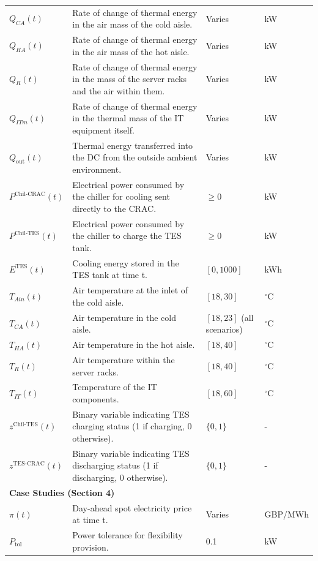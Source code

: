 \documentclass[lettersize,journal]{IEEEtran}
\begin{document}
{{\begin{longtable}{p{} p{} p{} p{}}
$Q_{CA}(t)$ & Rate of change of thermal energy in the air mass of the cold aisle. & Varies &kW \\
$Q_{HA}(t)$ & Rate of change of thermal energy in the air mass of the hot aisle. & Varies &kW \\
$Q_{R}(t)$ & Rate of change of thermal energy in the mass of the server racks and the air within them. & Varies &kW \\
$Q_{ITm}(t)$ & Rate of change of thermal energy in the thermal mass of the IT equipment itself. & Varies &kW \\
$Q_{\mathrm{out}}(t)$ & Thermal energy transferred into the DC from the outside ambient environment. & Varies &kW \\
$P^{\mathrm{Chil}\text{-}\mathrm{CRAC}}(t)$ & Electrical power consumed by the chiller for cooling sent directly to the CRAC. & $\geq 0$ &kW \\
$P^{\mathrm{Chil}\text{-}\mathrm{TES}}(t)$ & Electrical power consumed by the chiller to charge the TES tank. & $\geq 0$ &kW \\
$E^{\mathrm{TES}}(t)$ & Cooling energy stored in the TES tank at time t. & $[0, 1000]$ &kWh \\
$T_{Ain}(t)$ & Air temperature at the inlet of the cold aisle. & $[18, 30]$ & $^{\circ}$C \\
$T_{CA}(t)$ & Air temperature in the cold aisle. & $[18, 23]$ (all scenarios) & $^{\circ}$C \\
$T_{HA}(t)$ & Air temperature in the hot aisle. & $[18, 40]$ & $^{\circ}$C \\
$T_{R}(t)$ & Air temperature within the server racks. & $[18, 40]$ & $^{\circ}$C \\
$T_{IT}(t)$ & Temperature of the IT components. & $[18, 60]$ & $^{\circ}$C \\
$z^{\mathrm{Chil}\text{-}\mathrm{TES}}(t)$ & Binary variable indicating TES charging status (1 if charging, 0 otherwise). & $\{0, 1\}$ & - \\
$z^{\mathrm{TES}\text{-}\mathrm{CRAC}}(t)$ & Binary variable indicating TES discharging status (1 if discharging, 0 otherwise). & $\{0, 1\}$ & - \\
\midrule
\multicolumn{4}{l}{\textbf{Case Studies (Section 4)}} \\
\midrule
$\pi(t)$ & Day-ahead spot electricity price at time t. & Varies & GBP/MWh \\
$P_{\mathrm{tol}}$ & Power tolerance for flexibility provision. & 0.1 &kW \\

\end{longtable}}}
\end{document}
